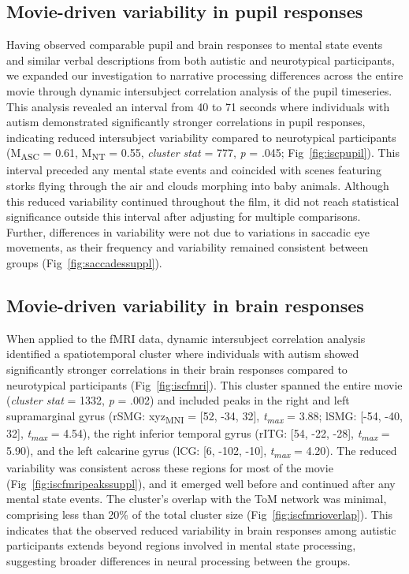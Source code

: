 \subsection*{Movie-driven variability in pupil responses }
Having observed comparable pupil and brain responses to mental state events and similar verbal descriptions from both autistic and neurotypical participants, we expanded our investigation to narrative processing differences across the entire movie through dynamic intersubject correlation analysis of the pupil timeseries. This analysis revealed an interval from 40 to 71 seconds where individuals with autism demonstrated significantly stronger correlations in pupil responses, indicating reduced intersubject variability compared to neurotypical participants (M\textsubscript{ASC} = 0.61, M\textsubscript{NT} = 0.55, \textit{cluster stat} = 777, \textit{p} = .045; Fig~\ref{fig:iscpupil}). This interval preceded any mental state events and coincided with scenes featuring storks flying through the air and clouds morphing into baby animals. Although this reduced variability continued throughout the film, it did not reach statistical significance outside this interval after adjusting for multiple comparisons. Further, differences in variability were not due to variations in saccadic eye movements, as their frequency and variability remained consistent between groups (Fig~\ref{fig:saccadessuppl}).


\subsection*{Movie-driven variability in brain responses}
When applied to the fMRI data, dynamic intersubject correlation analysis identified a spatiotemporal cluster where individuals with autism showed significantly stronger correlations in their brain responses compared to neurotypical participants (Fig~\ref{fig:iscfmri}). This cluster spanned the entire movie (\textit{cluster stat} = 1332, \textit{p} = .002) and included peaks in the right and left supramarginal gyrus (rSMG: xyz\textsubscript{MNI} = [52, -34, 32], \textit{t\textsubscript{max}} = 3.88; lSMG: [-54, -40, 32], \textit{t\textsubscript{max}} = 4.54), the right inferior temporal gyrus (rITG: [54, -22, -28], \textit{t\textsubscript{max}} = 5.90), and the left calcarine gyrus (lCG: [6, -102, -10], \textit{t\textsubscript{max}} = 4.20). The reduced variability was consistent across these regions for most of the movie (Fig~\ref{fig:iscfmripeakssuppl}), and it emerged well before and continued after any mental state events. The cluster's overlap with the ToM network was minimal, comprising less than 20\% of the total cluster size (Fig~\ref{fig:iscfmrioverlap}). This indicates that the observed reduced variability in brain responses among autistic participants extends beyond regions involved in mental state processing, suggesting broader differences in neural processing between the groups.

